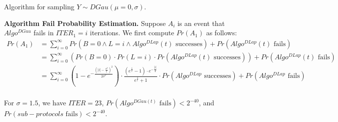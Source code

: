 \begin{algorithm}[tbh!]
    \centering
    \caption{Algorithm for sampling $Y\sim DGau \left(\mu=0,\sigma\right)$.}
    \label{algo:DiscreteGauss}
\end{algorithm}
\FloatBarrier

\textbf{Algorithm Fail Probability Estimation. }
Suppose $A_i$ is an event that $Algo^{DGau}$ fails in $ITER_1=i$ iterations.
We first compute $Pr\left(A_1\right) $ as follows:
\begin{equation}
    \begin{split}
        Pr\left(A_1\right) &=\sum_{i = 0}^{\infty}  Pr\left( B= 0 \land L=i \land Algo^{DLap}\left(t\right)  \text{ successes}\right) + Pr\left(Algo^{DLap}\left(t\right)  \text{ fails}\right) \\
        &= \sum_{i = 0}^{\infty}  \left(Pr\left( B= 0 \right) \cdot Pr\left( L=i \right)\cdot Pr\left(  Algo^{DLap}\left(t\right)  \text{ successes}\right)\right) + Pr\left(Algo^{DLap}\left(t\right)  \text{ fails}\right) \\
        &=\sum_{i = 0}^{\infty} \left(1-e^{-\frac{\left(\left\lvert i\right\rvert-\frac{\sigma^2}{t}\right)^2  }{2\sigma^2}}\right)  \cdot \frac{\left(e^{\frac{1}{t}}-1\right) \cdot  e^{-\frac{\left\lvert i\right\rvert }{d}}}{e^{\frac{1}{t}}+1} \cdot Pr\left(Algo^{DLap} \text{ successes}\right)  + Pr\left(Algo^{DLap} \text{ fails}\right) \\
    \end{split}
\end{equation}

For $\sigma =1.5$, we have $ITER=23$, $Pr\left( Algo^{DGau\left(t\right) } \text{ fails} \right) <2^{-40}$, and $Pr\left( sub-protocols  \text{ fails} \right) <2^{-40}$.

